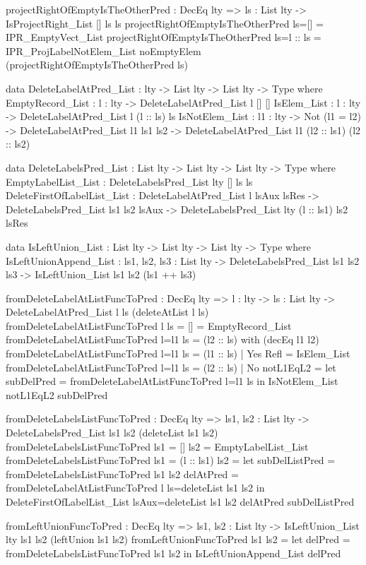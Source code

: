 \begin{code}
projectRightOfEmptyIsTheOtherPred : DecEq lty => 
  {ls : List lty} -> IsProjectRight_List [] ls ls
projectRightOfEmptyIsTheOtherPred {ls=[]} = IPR_EmptyVect_List
projectRightOfEmptyIsTheOtherPred {ls=l :: ls} = 
  IPR_ProjLabelNotElem_List noEmptyElem 
    (projectRightOfEmptyIsTheOtherPred {ls})

data DeleteLabelAtPred_List : lty -> List lty -> List lty -> 
  Type where
  EmptyRecord_List : {l : lty} -> DeleteLabelAtPred_List l [] []
  IsElem_List : {l : lty} -> DeleteLabelAtPred_List l (l :: ls) ls
  IsNotElem_List : {l1 : lty} -> Not (l1 = l2) -> 
    DeleteLabelAtPred_List l1 ls1 ls2 -> 
    DeleteLabelAtPred_List l1 (l2 :: ls1) (l2 :: ls2)

data DeleteLabelsPred_List : List lty -> List lty -> List lty -> 
  Type where
  EmptyLabelList_List : DeleteLabelsPred_List {lty} [] ls ls
  DeleteFirstOfLabelList_List : 
    DeleteLabelAtPred_List l lsAux lsRes -> 
    DeleteLabelsPred_List ls1 ls2 lsAux ->
    DeleteLabelsPred_List {lty} (l :: ls1) ls2 lsRes

data IsLeftUnion_List : List lty -> List lty -> List lty -> 
  Type where
  IsLeftUnionAppend_List : {ls1, ls2, ls3 : List lty} -> 
    DeleteLabelsPred_List ls1 ls2 ls3 -> 
    IsLeftUnion_List ls1 ls2 (ls1 ++ ls3)

fromDeleteLabelAtListFuncToPred : DecEq lty => {l : lty} -> 
  {ls : List lty} -> 
  DeleteLabelAtPred_List l ls (deleteAtList l ls)
fromDeleteLabelAtListFuncToPred {l} {ls = []} = EmptyRecord_List
fromDeleteLabelAtListFuncToPred {l=l1} {ls = (l2 :: ls)} 
  with (decEq l1 l2)
  fromDeleteLabelAtListFuncToPred {l=l1} {ls = (l1 :: ls)} | 
    Yes Refl = IsElem_List
  fromDeleteLabelAtListFuncToPred {l=l1} {ls = (l2 :: ls)} | 
    No notL1EqL2 = 
    let subDelPred = fromDeleteLabelAtListFuncToPred {l=l1} {ls}
    in IsNotElem_List notL1EqL2 subDelPred  
  
fromDeleteLabelsListFuncToPred : DecEq lty => 
  {ls1, ls2 : List lty} -> 
  DeleteLabelsPred_List ls1 ls2 (deleteList ls1 ls2)
fromDeleteLabelsListFuncToPred {ls1 = []} {ls2} = 
  EmptyLabelList_List
fromDeleteLabelsListFuncToPred {ls1 = (l :: ls1)} {ls2} =
  let subDelListPred = fromDeleteLabelsListFuncToPred {ls1} {ls2}
      delAtPred = 
        fromDeleteLabelAtListFuncToPred {l} {ls=deleteList ls1 ls2}
  in DeleteFirstOfLabelList_List {lsAux=deleteList ls1 ls2} 
       delAtPred subDelListPred

fromLeftUnionFuncToPred : DecEq lty => {ls1, ls2 : List lty} -> 
  IsLeftUnion_List {lty} ls1 ls2 (leftUnion ls1 ls2)   
fromLeftUnionFuncToPred {ls1} {ls2} =
  let delPred = fromDeleteLabelsListFuncToPred {ls1} {ls2}
  in IsLeftUnionAppend_List delPred


\end{code}
